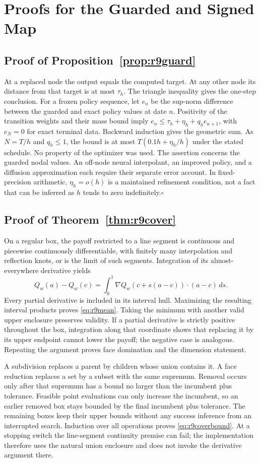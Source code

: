 \section{Proofs for the Guarded and Signed Map}\label{app:r9proofs}
\subsection{Proof of Proposition~\ref{prop:r9guard}}
At a replaced node the output equals the computed target. At any other node its distance from that target is at most $\tau_h$. The triangle inequality gives the one-step conclusion. For a frozen policy sequence, let $e_n$ be the sup-norm difference between the guarded and exact policy values at date $n$. Positivity of the transition weights and their mass bound imply $e_n\leq\tau_h+\eta_h+q_he_{n+1}$, with $e_N=0$ for exact terminal data. Backward induction gives the geometric sum. As $N=T/h$ and $q_h\leq1$, the bound is at most $T(0.1h+\eta_h/h)$ under the stated schedule. No property of the optimizer was used. The assertion concerns the guarded nodal values. An off-node neural interpolant, an improved policy, and a diffusion approximation each require their separate error account. In fixed-precision arithmetic, $\eta_h=o(h)$ is a maintained refinement condition, not a fact that can be inferred as $h$ tends to zero indefinitely.\hfill$\square$

\subsection{Proof of Theorem~\ref{thm:r9cover}}
On a regular box, the payoff restricted to a line segment is continuous and piecewise continuously differentiable, with finitely many interpolation and reflection knots, or is the limit of such segments. Integration of its almost-everywhere derivative yields
\[
 Q_w(a)-Q_w(c)=\int_0^1 \nabla Q_w(c+s(a-c))\cdot(a-c)\,ds.
\]
Every partial derivative is included in its interval hull. Maximizing the resulting interval products proves \eqref{eq:r9mean}. Taking the minimum with another valid upper enclosure preserves validity. If a partial derivative is strictly positive throughout the box, integration along that coordinate shows that replacing it by its upper endpoint cannot lower the payoff; the negative case is analogous. Repeating the argument proves face domination and the dimension statement.

A subdivision replaces a parent by children whose union contains it. A face reduction replaces a set by a subset with the same supremum. Removal occurs only after that supremum has a bound no larger than the incumbent plus tolerance. Feasible point evaluations can only increase the incumbent, so an earlier removed box stays bounded by the final incumbent plus tolerance. The remaining boxes keep their upper bounds without any success inference from an interrupted search. Induction over all operations proves \eqref{eq:r9coverbound}. At a stopping switch the line-segment continuity premise can fail; the implementation therefore uses the natural union enclosure and does not invoke the derivative argument there.

